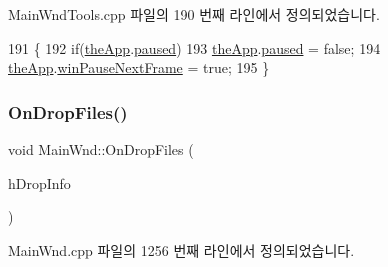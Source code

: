 Main\+Wnd\+Tools.\+cpp 파일의 190 번째 라인에서 정의되었습니다.


\begin{DoxyCode}
191 \{
192   \textcolor{keywordflow}{if}(\mbox{\hyperlink{_v_b_a_8cpp_a8095a9d06b37a7efe3723f3218ad8fb3}{theApp}}.\mbox{\hyperlink{class_v_b_a_af7447bf3bf3f93948d2757e4cb223cfc}{paused}})
193     \mbox{\hyperlink{_v_b_a_8cpp_a8095a9d06b37a7efe3723f3218ad8fb3}{theApp}}.\mbox{\hyperlink{class_v_b_a_af7447bf3bf3f93948d2757e4cb223cfc}{paused}} = \textcolor{keyword}{false};
194   \mbox{\hyperlink{_v_b_a_8cpp_a8095a9d06b37a7efe3723f3218ad8fb3}{theApp}}.\mbox{\hyperlink{class_v_b_a_a76ae27aad714b508806d1799afe97a50}{winPauseNextFrame}} = \textcolor{keyword}{true};
195 \}
\end{DoxyCode}
\mbox{\label{class_main_wnd_a360d0179bc8f8ae13dfb4cdf573e2c55}} 
\subsubsection{\texorpdfstring{On\+Drop\+Files()}{OnDropFiles()}}
{\footnotesize\ttfamily void Main\+Wnd\+::\+On\+Drop\+Files (\begin{DoxyParamCaption}\item[{H\+D\+R\+OP}]{h\+Drop\+Info }\end{DoxyParamCaption})\hspace{0.3cm}{\ttfamily [protected]}}



Main\+Wnd.\+cpp 파일의 1256 번째 라인에서 정의되었습니다.


